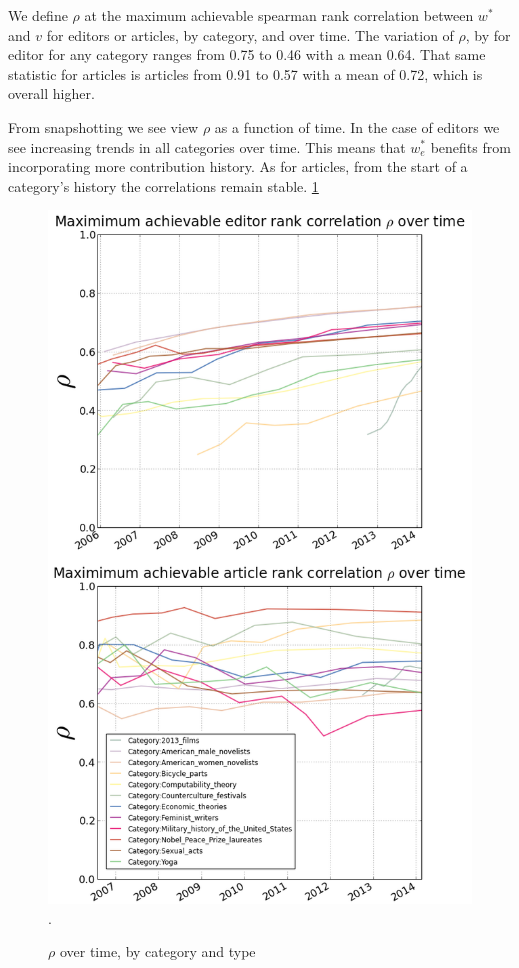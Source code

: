 \documentclass{acm_proc_article-sp}
\begin{document}
We define $\rho$ at the maximum achievable spearman rank correlation between $w^*$ and $v$ for editors or articles, by category, and over time. The variation of $\rho$, by for editor for any category ranges from 0.75 to 0.46 with a mean 0.64.  That same statistic for articles is articles from 0.91 to 0.57 with a mean of 0.72, which is overall higher.

 
From snapshotting we see view $\rho$ as  a function of time. In the case of editors we see increasing trends in all categories over time. This means that $w^*_e$ benefits from incorporating more contribution history. As for articles, from the start of a category's history the correlations remain stable. \ref{fig:rhotime}

\begin{figure}[!t]
\centering
\includegraphics[width=0.9\columnwidth]{rho_combined.png}.
\caption{$\rho$ over time, by category and type}
\label{fig:rhotime}
\end{figure}
\end{document}
